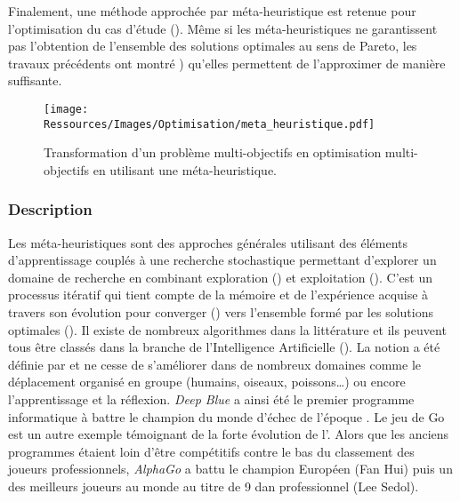 Finalement, une méthode approchée par méta-heuristique est retenue pour l’optimisation du
cas d’étude (). Même si les méta-heuristiques ne garantissent pas
l’obtention de l’ensemble des solutions optimales au sens de Pareto, les travaux
précédents ont montré \parencite{Rivallain2013,Recht2016}) qu’elles permettent de
l’approximer de manière suffisante.

\begin{figure}
    \centering
    \texttt{[image: Ressources/Images/Optimisation/meta\_heuristique.pdf]}
    \caption[Transformation d’un problème multi-objectifs en optimisation multi-objectifs]
            {Transformation d’un problème multi-objectifs en optimisation
             multi-objectifs en utilisant une méta-heuristique.}
    \label{fig:multi_meta}
\end{figure}

\subsubsection{Description} %
\label{ssub:description_meta}
Les méta-heuristiques sont des approches générales utilisant des éléments d’apprentissage
couplés à une recherche stochastique permettant d’explorer un domaine de recherche en
combinant exploration () et exploitation
(). C’est un processus itératif qui tient compte de la
mémoire et de l’expérience acquise à travers son évolution pour converger
() vers l’ensemble formé par les solutions optimales
(). Il existe de nombreux algorithmes dans la littérature et
ils peuvent tous être classés dans la branche de l’Intelligence Artificielle (). La
notion a été définie par
 et ne cesse de s’améliorer dans de nombreux domaines comme le
déplacement organisé en groupe (humains, oiseaux, poissons\dots) ou encore l’apprentissage
et la réflexion. \textit{Deep Blue} a ainsi été le premier programme informatique à battre
le champion du monde d’échec de l’époque \parencite{Hsu199970}. Le jeu de Go est un autre
exemple témoignant de la forte évolution de l’. Alors que les anciens programmes étaient
loin d’être compétitifs contre le bas du classement des joueurs professionnels,
\textit{AlphaGo} \parencite{Silver2016484} a battu le champion Européen (Fan Hui) puis un
des meilleurs joueurs au monde au titre de 9 dan professionnel (Lee Sedol).

